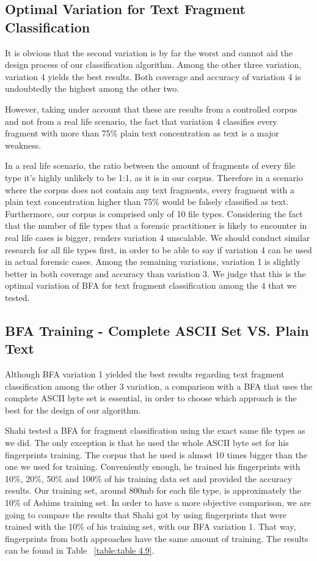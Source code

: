   \pagebreak

\subsection{Optimal Variation for Text Fragment Classification}
It is obvious that the second variation is by far the worst and cannot aid the design process of our classification algorithm. Among the other three variation, variation 4 yields the best results. Both coverage and accuracy of variation 4 is undoubtedly the highest among the other two.

However, taking under account that these are results from a controlled corpus and not from a real life scenario, the fact that variation 4 classifies every fragment with more than 75\% plain text concentration as text is a major weakness.

In a real life scenario, the ratio between the amount of fragments of every file type it's highly unlikely to be 1:1, as it is in our corpus. Therefore in a scenario where the corpus does not contain any text fragments, every fragment with a plain text concentration higher than 75\% would be falsely classified as text. Furthermore, our corpus is comprised only of 10 file types. Considering the fact that the number of file types that a forensic practitioner is likely to encounter in real life cases is bigger, renders variation 4 unscalable. We should conduct similar research for all file types first, in order to be able to say if variation 4 can be used in actual forensic cases. Among the remaining variations, variation 1 is slightly better in both coverage and accuracy than variation 3. We judge that this is the optimal variation of BFA for text fragment classification among the 4 that we tested.


\subsection{BFA Training - Complete ASCII Set VS. Plain Text }
Although BFA variation 1 yielded the best results regarding text fragment classification among the other 3 variation, a comparison with a BFA that uses the complete ASCII byte set is essential, in order to choose which approach is the best for the design of our algorithm.

Shahi\cite{Ashim} tested a BFA for fragment classification using the exact same file types as we did. The only exception is that he used the whole ASCII byte set for his fingerprints training. The corpus that he used is almost 10 times bigger than the one we used for training. Conveniently enough, he trained his fingerprints with 10\%, 20\%, 50\% and 100\% of his training data set and provided the accuracy results. Our training set, around 800mb for each file type, is approximately the 10\% of Ashims training set. In order to have a more objective comparison, we are going to compare the results that Shahi got by using fingerprints that were trained with the 10\% of his training set, with our BFA variation 1. That way, fingerprints from both approaches have the same amount of training. The results can be found in Table ~\ref{table:table 4.9}.

